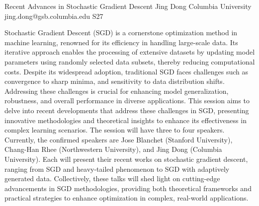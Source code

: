 \begin{session}
 {Recent Advances in Stochastic Gradient Descent}%
 {Jing Dong}%
 {Columbia University}%
 {jing.dong@gsb.columbia.edu}%
{}{}{}
 {S27}%
{}

 Stochastic Gradient Descent (SGD) is a cornerstone optimization method in machine learning,
 renowned for its efficiency in handling large-scale data. Its iterative approach enables
 the processing of extensive datasets by updating model parameters using randomly selected
 data subsets, thereby reducing computational costs. Despite its widespread adoption, traditional
 SGD faces challenges such as convergence to sharp minima, and sensitivity to data
 distribution shifts. Addressing these challenges is crucial for enhancing model generalization,
 robustness, and overall performance in diverse applications. This session aims to delve into
 recent developments that address these challenges in SGD, presenting innovative methodologies
 and theoretical insights to enhance its effectiveness in complex learning scenarios.
 The session will have three to four speakers. Currently, the confirmed speakers are Jose
 Blanchet (Stanford University), Chang-Han Rhee (Northwestern University), and Jing Dong
 (Columbia University). Each will present their recent works on stochastic gradient descent,
 ranging from SGD and heavy-tailed phenomenon to SGD with adaptively generated data.
 Collectively, these talks will shed light on cutting-edge advancements in SGD methodologies,
 providing both theoretical frameworks and practical strategies to enhance optimization in
 complex, real-world applications.
\end{session}



\clearpage

